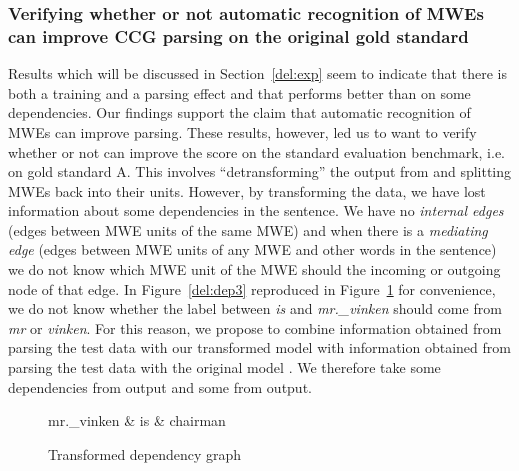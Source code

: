\documentclass[output=paper]{langsci/langscibook}
\begin{document}
    \subsubsection{Verifying whether or not automatic recognition of MWEs can improve CCG parsing on the original gold standard}
    \label{del:evalA}
    \indent Results which will be discussed in Section~\ref{del:exp} seem to indicate that there is both a training and a parsing effect and that {\modelB} performs better than {\modelA} on some dependencies. Our findings support the claim that automatic recognition of MWEs can improve  parsing. These results, however, led us to want to verify whether or not {\modelB} can improve the score on the standard evaluation benchmark, i.e. on gold standard A. This involves ``detransforming'' the output from {\modelB} and splitting MWEs back into their units. However, by transforming the data, we have lost information about some dependencies in the sentence. We have no \textit{internal edges} (edges between MWE units of the same MWE) and when there is a \textit{mediating edge} (edges between MWE units of any MWE and other words in the sentence) we do not know which MWE unit of the MWE should the incoming or outgoing node of that edge. In Figure~\ref{del:dep3} reproduced in Figure~\ref{del:dep5} for convenience, we do not know whether the label between \textit{is} and \textit{mr.\_vinken} should come from \textit{mr} or \textit{vinken}. For this reason, we propose to combine information obtained from parsing the test data with our transformed model {\modelB} with information obtained from parsing the test data with the original model {\modelA}. We therefore take some dependencies from output and some from output.

    \begin{figure}[h]
        \center
        \begin{dependency}
            \begin{deptext}[column sep=1em]
                mr.\_vinken \& is \& chairman \\
            \end{deptext}
        \end{dependency}
        \caption{Transformed dependency graph\label{del:dep5}}
    \end{figure}
\end{document}
